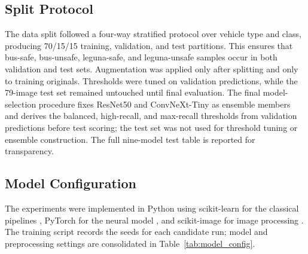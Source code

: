 \documentclass{article}
\begin{document}
\subsection{Split Protocol}
The data split followed a four-way stratified protocol over vehicle type and class, producing 70/15/15 training, validation, and test partitions. This ensures that bus-safe, bus-unsafe, leguna-safe, and leguna-unsafe samples occur in both validation and test sets. Augmentation was applied only after splitting and only to training originals. Thresholds were tuned on validation predictions, while the 79-image test set remained untouched until final evaluation. The final model-selection procedure fixes ResNet50 and ConvNeXt-Tiny as ensemble members and derives the balanced, high-recall, and max-recall thresholds from validation predictions before test scoring; the test set was not used for threshold tuning or ensemble construction. The full nine-model test table is reported for transparency.

\subsection{Model Configuration}
The experiments were implemented in Python using scikit-learn for the classical pipelines \cite{pedregosa2011sklearn}, PyTorch for the neural model \cite{paszke2019pytorch}, and scikit-image for image processing \cite{vanderwalt2014skimage}. The training script records the seeds for each candidate run; model and preprocessing settings are consolidated in Table~\ref{tab:model_config}.
\end{document}
